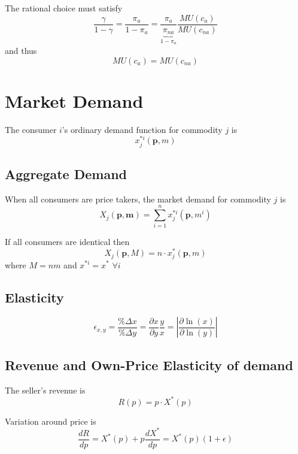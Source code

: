 \documentclass[a4paper] {scrartcl}
\begin{document}
The rational choice must satisfy
\begin{equation}
	\frac{\gamma}{1-\gamma}=\frac{\pi_a}{1-\pi_a}=
	\frac{\pi_a}{\underbrace{\pi_{na}}_{1-\pi_a}}\frac{MU(c_a)}{MU(c_{na})} 
\end{equation}
and thus
\begin{equation}
	MU(c_a) = MU(c_{na})
\end{equation}

\section{Market Demand}
The consumer $i$'s ordinary demand function for commodity $j$ is 
\begin{equation}
	x_j^{*i}(\mathbf{p}, m)
\end{equation}
\subsection{Aggregate Demand}
When all consumers are price takers, the market demand for commodity $j$ is
\begin{equation}
	X_j(\mathbf{p}, \mathbf{m}) = \sum_{i=1}^n x_j^{*i}(\mathbf{p}, m^i)
\end{equation}

If all consumers are identical then
\begin{equation}
	X_j(\mathbf{p}, M) = n\cdot x_j^*(\mathbf{p}, m)
\end{equation}
where $M=nm$ and $x^{*i}=x^*$ $\forall i$

\subsection{Elasticity}
\begin{equation}
	\epsilon_{x,y} 
	= \frac{\%\Delta x}{\%\Delta y} 
	= \frac{\partial x}{\partial y}\frac{y}{x}
	=\left |\frac{\partial \ln{(x)}}{\partial\ln{(y)}}\right |
\end{equation}

\subsection{Revenue and Own-Price Elasticity of demand}
The seller's revenue is
\begin{equation}
	R(p) = p\cdot X^{*}(p)
\end{equation}

Variation around price is
\begin{equation}
	\frac{dR}{dp} = X^*(p)+p\frac{dX^*}{dp} = X^*(p)(1+\epsilon)
\end{equation}
\end{document}
